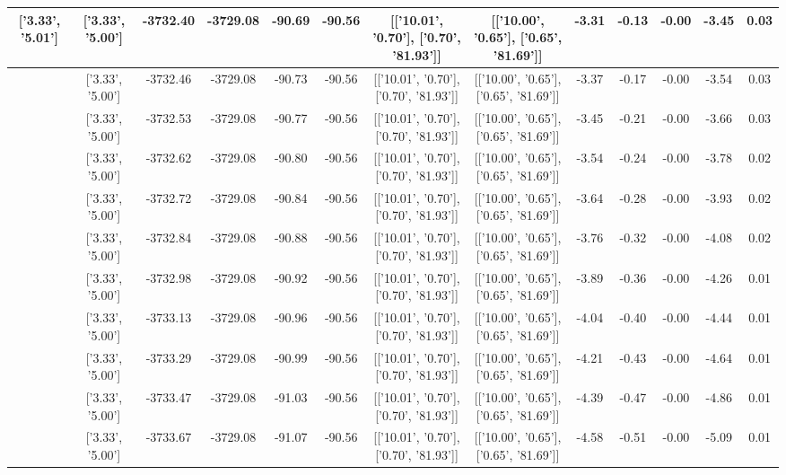 \begin{table}[htbp]
\begin{adjustbox}{angle=90}
\begin{tabular}{|c|c|c|c|c|c|c|c|c|c|c|c|c|}
 ['3.33', '5.01'] & ['3.33', '5.00'] & -3732.40 & -3729.08 & -90.69 & -90.56 & [['10.01', '0.70'], ['0.70', '81.93']] & [['10.00', '0.65'], ['0.65', '81.69']] & -3.31 & -0.13 & -0.00 & -3.45 & 0.03\\ \hline
 ['3.34', '5.01'] & ['3.33', '5.00'] & -3732.46 & -3729.08 & -90.73 & -90.56 & [['10.01', '0.70'], ['0.70', '81.93']] & [['10.00', '0.65'], ['0.65', '81.69']] & -3.37 & -0.17 & -0.00 & -3.54 & 0.03\\ \hline
 ['3.34', '5.01'] & ['3.33', '5.00'] & -3732.53 & -3729.08 & -90.77 & -90.56 & [['10.01', '0.70'], ['0.70', '81.93']] & [['10.00', '0.65'], ['0.65', '81.69']] & -3.45 & -0.21 & -0.00 & -3.66 & 0.03\\ \hline
 ['3.34', '5.01'] & ['3.33', '5.00'] & -3732.62 & -3729.08 & -90.80 & -90.56 & [['10.01', '0.70'], ['0.70', '81.93']] & [['10.00', '0.65'], ['0.65', '81.69']] & -3.54 & -0.24 & -0.00 & -3.78 & 0.02\\ \hline
 ['3.34', '5.01'] & ['3.33', '5.00'] & -3732.72 & -3729.08 & -90.84 & -90.56 & [['10.01', '0.70'], ['0.70', '81.93']] & [['10.00', '0.65'], ['0.65', '81.69']] & -3.64 & -0.28 & -0.00 & -3.93 & 0.02\\ \hline
 ['3.34', '5.01'] & ['3.33', '5.00'] & -3732.84 & -3729.08 & -90.88 & -90.56 & [['10.01', '0.70'], ['0.70', '81.93']] & [['10.00', '0.65'], ['0.65', '81.69']] & -3.76 & -0.32 & -0.00 & -4.08 & 0.02\\ \hline
 ['3.34', '5.01'] & ['3.33', '5.00'] & -3732.98 & -3729.08 & -90.92 & -90.56 & [['10.01', '0.70'], ['0.70', '81.93']] & [['10.00', '0.65'], ['0.65', '81.69']] & -3.89 & -0.36 & -0.00 & -4.26 & 0.01\\ \hline
 ['3.34', '5.01'] & ['3.33', '5.00'] & -3733.13 & -3729.08 & -90.96 & -90.56 & [['10.01', '0.70'], ['0.70', '81.93']] & [['10.00', '0.65'], ['0.65', '81.69']] & -4.04 & -0.40 & -0.00 & -4.44 & 0.01\\ \hline
 ['3.34', '5.01'] & ['3.33', '5.00'] & -3733.29 & -3729.08 & -90.99 & -90.56 & [['10.01', '0.70'], ['0.70', '81.93']] & [['10.00', '0.65'], ['0.65', '81.69']] & -4.21 & -0.43 & -0.00 & -4.64 & 0.01\\ \hline
 ['3.35', '5.01'] & ['3.33', '5.00'] & -3733.47 & -3729.08 & -91.03 & -90.56 & [['10.01', '0.70'], ['0.70', '81.93']] & [['10.00', '0.65'], ['0.65', '81.69']] & -4.39 & -0.47 & -0.00 & -4.86 & 0.01\\ \hline
 ['3.35', '5.01'] & ['3.33', '5.00'] & -3733.67 & -3729.08 & -91.07 & -90.56 & [['10.01', '0.70'], ['0.70', '81.93']] & [['10.00', '0.65'], ['0.65', '81.69']] & -4.58 & -0.51 & -0.00 & -5.09 & 0.01\\ \hline

\end{tabular}
\end{adjustbox}
\end{table}
